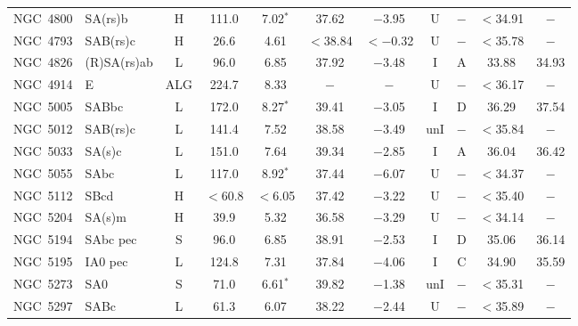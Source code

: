 \begin{center}
\begin{longtable}{lC{2.5cm}ccccccccc}
NGC~4800 & SA(rs)b           & H                 & 111.0   & 7.02$^{*}$          & 37.62    & $-$3.95        & U   &$-$    & $<$34.91 & $-$            \\
NGC~4793 & SAB(rs)c          & H                 & 26.6  & 4.61                 & $<$38.84    & $<-$0.32   & U   &$-$       & $<$35.78 & $-$            \\
NGC~4826 & (R)SA(rs)ab       & L          & 96.0    & 6.85                & 37.92 & $-$3.48          & I   & A         & 33.88    & 34.93        \\
NGC~4914 & E                     &   ALG      &     224.7   &  8.33     &    $-$       &    $-$     &  U &   $-$      & $<$36.17 & $-$  \\
NGC~5005  & SABbc          &   L           &   172.0       &   8.27$^{*}$        &  39.41  &  $-$3.05    & I  & D  &  36.29    &  37.54    \\
NGC~5012 & SAB(rs)c          & L                 & 141.4 & 7.52                & 38.58    & $-$3.49       & unI &$-$       & $<$35.84 & $-$            \\
NGC~5033 & SA(s)c          &  L                & 151.0   & 7.64                & 39.34    & $-$2.85      & I   & A        & 36.04   & 36.42         \\
NGC~5055  & SAbc          &   L               &   117.0   &  8.92$^{*}$  & 37.44   &  $-$6.07    &    U &  $-$      & $<$34.37 & $-$  \\
NGC~5112  & SBcd           & H               &  $<$60.8    &  $<$6.05    &   37.42   & $-$3.22   &   U &  $-$      & $<$35.40 & $-$  \\
NGC~5204 & SA(s)m            & H                 & 39.9  & 5.32                & 36.58    & $-$3.29     & U   &$-$       & $<$34.14 & $-$            \\
NGC~5194  & SAbc pec     & S                  &  96.0     &  6.85                &  38.91    & $-$2.53    &  I  & D  &  35.06   & 36.14    \\
NGC~5195  & IA0  pec      &  L               &    124.8   &  7.31             &  37.84    &  $-$4.06    &   I & C   &  34.90   &  35.59  \\
NGC~5273  & SA0            &   S            &    71.0          &  6.61$^{*}$    &   39.82    & $-$1.38     &   unI  & $-$      & $<$35.31 & $-$  \\
NGC~5297  & SABc          &   L           &     61.3       &   6.07            &   38.22    &   $-$2.44   &  U & $-$      & $<$35.89 & $-$  \\

\end{longtable}
\end{center}
